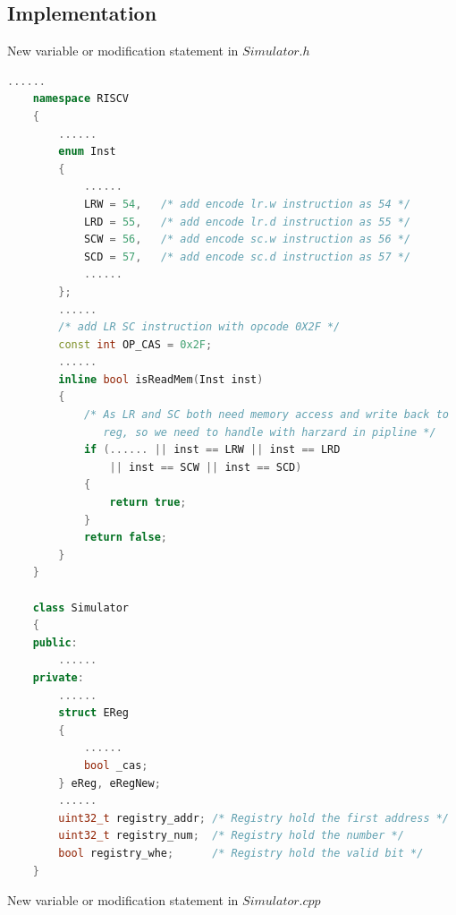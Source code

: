 \documentclass{article}
\begin{document}
\subsection{Implementation}
New variable or modification statement in $Simulator.h$
\begin{lstlisting}[language=c++]
    ......
    namespace RISCV
    {
        ......
        enum Inst
        {
            ......
            LRW = 54,   /* add encode lr.w instruction as 54 */
            LRD = 55,   /* add encode lr.d instruction as 55 */
            SCW = 56,   /* add encode sc.w instruction as 56 */
            SCD = 57,   /* add encode sc.d instruction as 57 */
            ......
        };
        ......
        /* add LR SC instruction with opcode 0X2F */
        const int OP_CAS = 0x2F;
        ......
        inline bool isReadMem(Inst inst)
        {
            /* As LR and SC both need memory access and write back to 
               reg, so we need to handle with harzard in pipline */
            if (...... || inst == LRW || inst == LRD
                || inst == SCW || inst == SCD)
            {
                return true;
            }
            return false;
        } 
    }

    class Simulator
    {
    public:
        ......
    private:
        ......
        struct EReg
        {
            ......
            bool _cas;
        } eReg, eRegNew;
        ......
        uint32_t registry_addr; /* Registry hold the first address */ 
        uint32_t registry_num;  /* Registry hold the number */
        bool registry_whe;      /* Registry hold the valid bit */
    }


\end{lstlisting}
New variable or modification statement in $Simulator.cpp$
\end{document}
